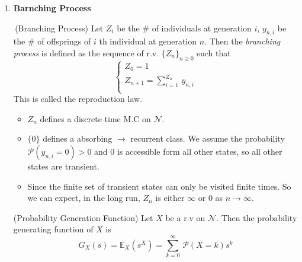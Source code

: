 \documentclass[10.5pt]{article}
\newcommand{\prob}[0]{\mathcal{P}}
\newenvironment{changemargin}[2]{%
  \begin{list}{}{%
    \setlength{\topsep}{0pt}%
    \setlength{\leftmargin}{#1}%
    \setlength{\rightmargin}{#2}%
    \setlength{\listparindent}{\parindent}%
    \setlength{\itemindent}{\parindent}%
    \setlength{\parsep}{\parskip}%
  }%
  \item[]}{\end{list}}
\begin{document}
\begin{changemargin}{-0.125in}{0in}
\begin{enumerate}
        \medskip
        
        \item \textbf{Barnching Process}
        
        \smallskip
        
        \begin{definition} \,(Branching Process) Let $Z_i$ be the \# of individuals at generation $i$, $y_{n,i}$ be the \# of offsprings of $i$ th individual at generation $n$. Then the \textit{branching process} is defined as the sequence of r.v. $\{Z_n\}_{n \geq 0}$ such that 
        \begin{equation}
      	           \begin{cases}
      		       Z_0 = 1\\
      		       Z_{n+1} = \sum^{Z_n}_{i = 1}\,y_{n, i}\\ 
      	           \end{cases}
      \end{equation}
            This is called the reproduction law. 
        \end{definition}
        
        
             	\begin{itemize}
             	
        		\item $Z_n$ defines a discrete time M.C on $\mathcal{N}$.
        		\item  $\{0\}$ defines a absorbing $\rightarrow$ recurrent class. We assume the probability $\prob(y_{n,i}= 0) > 0 $ and 0 is accessible form all other states, so all other states are transient.
        		\item Since the finite set of transient states can only be visited finite times. So we can expect, in the long run, $Z_n$ is either $\infty$ or 0 as $n\rightarrow\infty$.
        	\end{itemize}
        	
        	\medskip
        
            \begin{definition} (Probability Generation Function) Let $X$ be a r.v on $\mathcal{N}$. Then the probability generating function of $X$ is 
            \[
            G_X(s) = \mathbb{E}_X(s^X) = \sum_{k = 0}^\infty\,\prob(X = k)s^k
            \]
            \end{definition}
            

\end{enumerate}
\end{changemargin}
\end{document}
